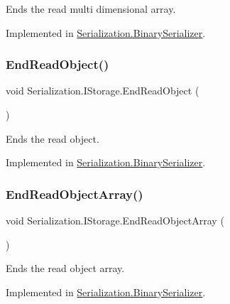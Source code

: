 Ends the read multi dimensional array. 



Implemented in \hyperlink{class_serialization_1_1_binary_serializer_a174c1b111506dcf2be86461ab54b00bc}{Serialization.\+Binary\+Serializer}.

\mbox{\label{interface_serialization_1_1_i_storage_af7f518486ceab2b980b6b90a16b33a97}} 
\subsubsection{\texorpdfstring{End\+Read\+Object()}{EndReadObject()}}
{\footnotesize\ttfamily void Serialization.\+I\+Storage.\+End\+Read\+Object (\begin{DoxyParamCaption}{ }\end{DoxyParamCaption})}



Ends the read object. 



Implemented in \hyperlink{class_serialization_1_1_binary_serializer_aa58ba842b871ad7030d126215a85c8cc}{Serialization.\+Binary\+Serializer}.

\mbox{\label{interface_serialization_1_1_i_storage_adcb0b93e93558a3ae5453c36bb04d8ff}} 
\subsubsection{\texorpdfstring{End\+Read\+Object\+Array()}{EndReadObjectArray()}}
{\footnotesize\ttfamily void Serialization.\+I\+Storage.\+End\+Read\+Object\+Array (\begin{DoxyParamCaption}{ }\end{DoxyParamCaption})}



Ends the read object array. 



Implemented in \hyperlink{class_serialization_1_1_binary_serializer_a3e796b301e9539b9082e0b32e3f61d49}{Serialization.\+Binary\+Serializer}.

